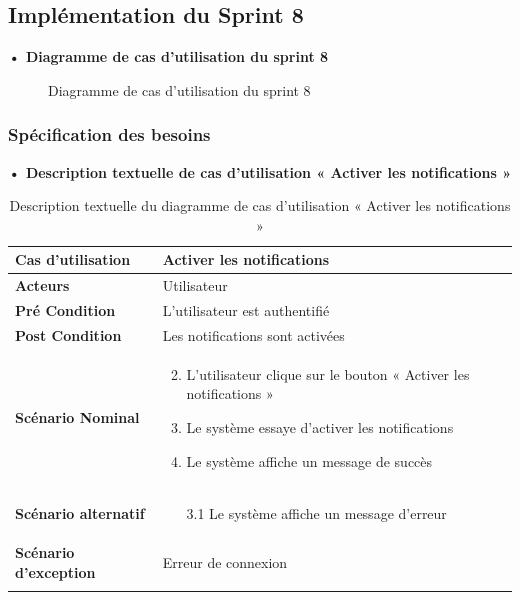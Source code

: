 \subsection{Implémentation du Sprint 8}
\textbf{•	Diagramme de cas d'utilisation du sprint 8}

\begin{figure}[H]
  \centering
  \caption{Diagramme de cas d'utilisation du sprint 8}
  \label{fig:UseCaseDiagramSp81}
\end{figure}

\subsubsection{Spécification des besoins}
\textbf{•	Description textuelle de cas d'utilisation « Activer les notifications »}

\begin{longtable}{|p{5cm}|p{10cm}|}
\hline
\textbf{Cas d'utilisation}&Activer les notifications\\
\hline
\textbf{Acteurs}&Utilisateur\\
\hline
\textbf{Pré Condition}&L'utilisateur est authentifié\\
\hline
\textbf{Post Condition}&Les notifications sont activées\\
\hline
\textbf{Scénario Nominal}&
\vspace{-\baselineskip}
\begin{enumerate}
  \setcounter{enumi}{1}
      \item L'utilisateur clique sur le bouton « Activer les notifications »
      \item Le système essaye d'activer les notifications
      \item Le système affiche un message de succès
\end{enumerate}\\
\hline
\textbf{Scénario alternatif}&
\vspace{-\baselineskip}
\begin{enumerate}
      \item [3.1] Le système affiche un message d'erreur
\end{enumerate}\\
\hline
\textbf{Scénario d'exception}&Erreur de connexion\\
\hline
\caption{Description textuelle du diagramme de cas d'utilisation « Activer les notifications »}
\label{tab:use_case_activer_notifications}
\end{longtable}

